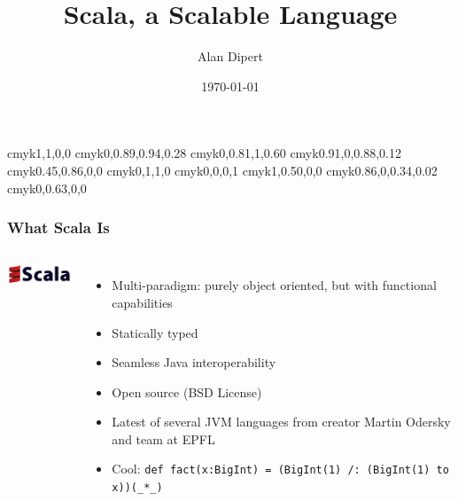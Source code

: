           {cmyk}{1,1,0,0}
      {cmyk}{0,0.89,0.94,0.28}
         {cmyk}{0,0.81,1,0.60}
   {cmyk}{0.91,0,0.88,0.12}
        {cmyk}{0.45,0.86,0,0}
           {cmyk}{0,1,1,0}
         {cmyk}{0,0,0,1}
     {cmyk}{1,0.50,0,0}
      {cmyk}{0.86,0,0.34,0.02}
 {cmyk}{0,0.63,0,0}

\title{Scala, a Scalable Language} 
\author{Alan Dipert} 
\date{\today} 

 
\maketitle 

\begin{frame} 
\frametitle{What Scala Is}
\begin{columns}[c]
  \column{0.5in}
    \includegraphics[width=1.0in]{graphics/scala_logo.png} 
  \column{2.5in}
    \begin{itemize}
      \item<1-> Multi-paradigm: purely object oriented, but with functional capabilities
      \item<2-> Statically typed
      \item<3-> Seamless Java interoperability
      \item<4-> Open source (BSD License)
      \item<5-> Latest of several JVM languages from creator Martin Odersky and team at EPFL
      \item<6-> Cool: \tt\small{def fact(x:BigInt) = (BigInt(1) /: (BigInt(1) to x))(\_*\_)}
    \end{itemize}
\end{columns}
\end{frame} 

